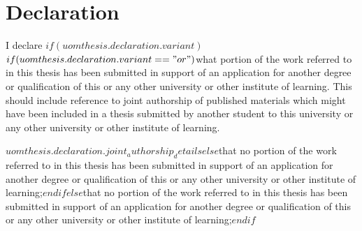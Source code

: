 \chapter*{Declaration}

I declare $if(uomthesis.declaration.variant)$$if(uomthesis.declaration.variant == "or")$what portion of the work referred to in this thesis has been submitted in support of an application for another degree or qualification of this or any other university or other institute of learning. This should include reference to joint authorship of published materials which might have been included in a thesis submitted by another student to this university or any other university or other institute of learning.

$uomthesis.declaration.joint_authorship_details$$else$that no portion of the work referred to in this thesis has been submitted in support of an application for another degree or qualification of this or any other university or other institute of learning;$endif$$else$that no portion of the work referred to in this thesis has been submitted in support of an application for another degree or qualification of this or any other university or other institute of learning;$endif$
